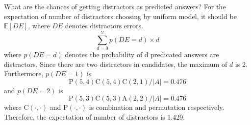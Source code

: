 \documentclass[11pt,a4paper]{article}
\begin{document}
What are the chances of getting distractors as predicted answers? For the expectation of number of distractors choosing by uniform model, it should be $\mathbb{E}[DE]$, where $DE$ denotes distractors errors.
\begin{equation}
    \sum_{d=0}^{2} p(DE=d)\times d
\end{equation}
where $p(DE=d)$ denotes the probability of d predicated answers are distractors. Since there are two distractors in candidates, the maximum of $d$ is 2.
Furthermore, $p(DE=1)$ is 
\begin{equation}
  \textrm{P}(5,4)\textrm{C}(5,4)\textrm{C}(2,1)/|A|=0.476
\end{equation}
and $p(DE=2)$ is
\begin{equation}
  \textrm{P}(5,3)\textrm{C}(5,3)\textrm{A}(2,2)/|A|=0.476
\end{equation}
where $\textrm{C}(\cdot,\cdot)$ and $\textrm{P}(\cdot,\cdot)$ is combination and permutation respectively. Therefore, the expectation of number of distractors is 1.429.
\end{document}
